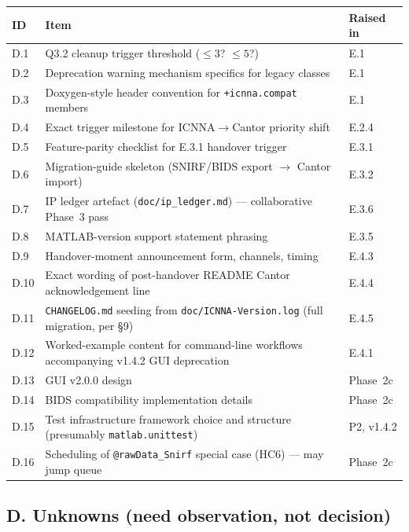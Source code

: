 \documentclass[11pt,a4paper]{article}
\begin{document}
\begin{longtable}{p{1.5cm}p{11cm}p{2.5cm}}
\toprule
\textbf{ID} & \textbf{Item} & \textbf{Raised in} \\
\midrule
\endhead
D.1  & Q3.2 cleanup trigger threshold ($\leq 3$? $\leq 5$?) & E.1 \\
D.2  & Deprecation warning mechanism specifics for legacy classes & E.1 \\
D.3  & Doxygen-style header convention for \texttt{+icnna.compat} members & E.1 \\
D.4  & Exact trigger milestone for ICNNA$\to$Cantor priority shift & E.2.4 \\
D.5  & Feature-parity checklist for E.3.1 handover trigger & E.3.1 \\
D.6  & Migration-guide skeleton (SNIRF/BIDS export $\to$ Cantor import) & E.3.2 \\
D.7  & IP ledger artefact (\texttt{doc/ip\_ledger.md}) --- collaborative Phase~3 pass & E.3.6 \\
D.8  & MATLAB-version support statement phrasing & E.3.5 \\
D.9  & Handover-moment announcement form, channels, timing & E.4.3 \\
D.10 & Exact wording of post-handover README Cantor acknowledgement line & E.4.4 \\
D.11 & \texttt{CHANGELOG.md} seeding from \texttt{doc/ICNNA-Version.log} (full migration, per §9) & E.4.5 \\
D.12 & Worked-example content for command-line workflows accompanying v1.4.2 GUI deprecation & E.4.1 \\
D.13 & GUI v2.0.0 design & Phase~2c \\
D.14 & BIDS compatibility implementation details & Phase~2c \\
D.15 & Test infrastructure framework choice and structure (presumably \texttt{matlab.unittest}) & P2, v1.4.2 \\
D.16 & Scheduling of \texttt{@rawData\_Snirf} special case (HC6) --- may jump queue & Phase~2c \\
\bottomrule
\end{longtable}

\subsection{D. Unknowns (need observation, not decision)}
\end{document}
